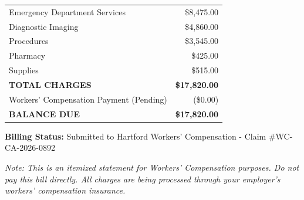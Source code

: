 \documentclass[11pt]{article}
\begin{document}
\begin{tabular}{@{}p{10cm}r@{}}
Emergency Department Services & \$8,475.00 \\
Diagnostic Imaging & \$4,860.00 \\
Procedures & \$3,545.00 \\
Pharmacy & \$425.00 \\
Supplies & \$515.00 \\
\midrule
\textbf{TOTAL CHARGES} & \textbf{\$17,820.00} \\
\midrule
Workers' Compensation Payment (Pending) & (\$0.00) \\
\textbf{BALANCE DUE} & \textbf{\$17,820.00} \\
\end{tabular}

\vspace{1.5em}

\textbf{Billing Status:} Submitted to Hartford Workers' Compensation - Claim \#WC-CA-2026-0892

\vspace{0.5em}
\small
\textit{Note: This is an itemized statement for Workers' Compensation purposes. Do not pay this bill directly. All charges are being processed through your employer's workers' compensation insurance.}
\end{document}
